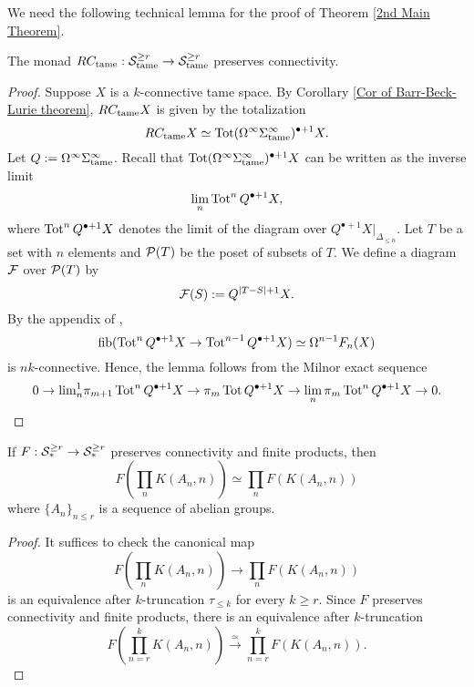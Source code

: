 We need the following technical lemma for the proof of Theorem \ref{2nd Main Theorem}.
\begin{lemma}
\label{RC_tame preserves connectivity}
The monad $RC_{\operatorname{\operatorname{tame}}}: {\mathcal{S}}^{\geq r}_{\operatorname{\operatorname{tame}}} \to 
{\mathcal{S}}^{\geq r}_{\operatorname{\operatorname{tame}}}$ preserves connectivity.
\end{lemma}
\begin{proof}
Suppose $X$ is a $k$-connective tame space.
By Corollary \ref{Cor of Barr-Beck-Lurie theorem}, 
$RC_{\operatorname{\operatorname{tame}}} X$ is given by the totalization 
$$
RC_{\operatorname{\operatorname{tame}}} X \simeq \operatorname{\operatorname{Tot}} (\Omega^{\infty} \Sigma^{\infty}_{\operatorname{\operatorname{tame}}})^{\bullet +1}  X.
$$
Let $Q:= \Omega^{\infty} \Sigma^{\infty}_{\operatorname{\operatorname{tame}}}$. Recall that $\operatorname{\operatorname{Tot}} (\Omega^{\infty} \Sigma^{\infty}_{\operatorname{\operatorname{tame}}})^{\bullet +1}  X$ can be written as the inverse limit 
$$
\lim_n \operatorname{\operatorname{Tot}}^n Q^{\bullet + 1} X,
$$
where $\operatorname{\operatorname{Tot}}^n Q^{\bullet + 1} X$ denotes the limit of the diagram over $Q^{\bullet + 1} X|_{\Delta_{\leq n}}$.
Let $T$ be a set with $n$ elements and ${\mathcal{P}}(T)$ be the poset of subsets of $T$. 
We define a diagram ${\mathcal{F}}$ over ${\mathcal{P}}(T)$ by
$$
{\mathcal{F}}(S):= Q^{|T-S| + 1} X.
$$
By the appendix of \cite{Arone-Kankaanrinta98},
$$
\operatorname{fib}(\operatorname{\operatorname{Tot}}^{n} Q^{\bullet + 1}X \to 
\operatorname{\operatorname{Tot}}^{n-1} Q^{\bullet + 1}X) 
\simeq 
\Omega^{n-1}F_n(X)
$$
is $nk$-connective. Hence, the lemma follows from the Milnor exact sequence
$$
0 \to {\lim}^{1}_n \pi_{m+1}\operatorname{\operatorname{Tot}}^{n} Q^{\bullet + 1}X \to \pi_m \operatorname{\operatorname{Tot}} Q^{\bullet + 1}X 
\to 
\lim_n \pi_m \operatorname{\operatorname{Tot}}^n Q^{\bullet + 1}X
\to 
0.
$$ 
  


\end{proof}

\begin{lemma}
\label{RV commutes infinite products of EM-spaces}
If $F:{\mathcal{S}}^{\geq r}_* \to {\mathcal{S}}^{\geq r}_*$ preserves connectivity and finite products, then 
$$
F(\prod_n K(A_n, n)) \simeq \prod_n F(K(A_n, n))
$$
where $\{A_n\}_{n\leq r}$ is a sequence of abelian groups.
\end{lemma}
\begin{proof}
It suffices to check the canonical map 
$$
F(\prod_n K(A_n, n)) \to \prod_n F(K(A_n, n))
$$ 
is an equivalence after $k$-truncation $\tau_{\leq k}$ for every $k\geq r$. Since $F$ preserves connectivity and finite products, there is an equivalence after $k$-truncation
$$
F(\prod_{n=r}^{k} K(A_n, n)) \xrightarrow{\simeq} \prod_{n=r}^{k}F( K(A_n,n)).
$$
\end{proof}

